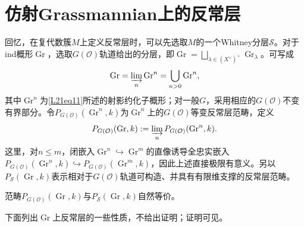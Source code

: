 \section{仿射Grassmannian上的反常层}\label{L21S3}
回忆，在复代数簇$M$上定义反常层时，可以先选取$M$的一个Whitney分层$\mathcal S$。对于ind概形$\operatorname{Gr}$，选取$G(\mathcal O)$轨道给出的分层，即$\operatorname{Gr}=\bigsqcup_{\lambda\in(X^\vee)^+}\operatorname{Gr}_\lambda$。可写成
\[\operatorname{Gr}=\varinjlim_n\operatorname{Gr}^n=\bigcup_{n>0}\operatorname{Gr}^n,\]
其中$\operatorname{Gr}^n$为\eqref{L21eq11}所述的射影约化子概形；对一般$G$，采用相应的$G(\mathcal O)$不变有界部分。令$P_{G(\mathcal O)}(\operatorname{Gr}^n,k)$为$\operatorname{Gr}^n$上的$G(\mathcal O)$等变反常层范畴，定义
\[P_{G(\mathcal O)}(\operatorname{Gr},k):=\varinjlim_nP_{G(\mathcal O)}(\operatorname{Gr}^n,k).\]
这里，对$n\le m$，闭嵌入$\operatorname{Gr}^n\hookrightarrow\operatorname{Gr}^m$的直像诱导全忠实嵌入$P_{G(\mathcal O)}(\operatorname{Gr}^n,k)\hookrightarrow P_{G(\mathcal O)}(\operatorname{Gr}^m,k)$，因此上述直接极限有意义。另以$P_{\mathcal S}(\operatorname{Gr},k)$表示相对于$G(\mathcal O)$轨道可构造、并具有有限维支撑的反常层范畴。
\begin{proposition}\label{L21S3O1}
范畴$P_{G(\mathcal O)}(\operatorname{Gr},k)$与$P_{\mathcal S}(\operatorname{Gr},k)$自然等价。
\end{proposition}
下面列出$\operatorname{Gr}$上反常层的一些性质，不给出证明；证明可见。
